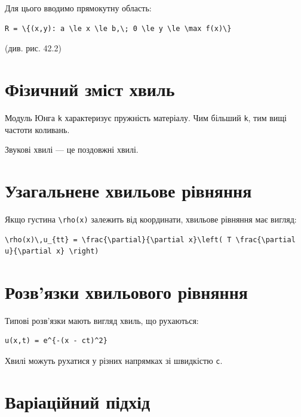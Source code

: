 \documentclass[
  ukrainian,
]{article}
\begin{document}
Для цього вводимо прямокутну область:

\begin{verbatim}
R = \{(x,y): a \le x \le b,\; 0 \le y \le \max f(x)\}
\end{verbatim}

(див. рис. 42.2)

\section{Фізичний зміст
хвиль}\label{ux444ux456ux437ux438ux447ux43dux438ux439-ux437ux43cux456ux441ux442-ux445ux432ux438ux43bux44c}

Модуль Юнга \texttt{k} характеризує пружність матеріалу. Чим більший
\texttt{k}, тим вищі частоти коливань.

Звукові хвилі --- це поздовжні хвилі.

\section{Узагальнене хвильове
рівняння}\label{ux443ux437ux430ux433ux430ux43bux44cux43dux435ux43dux435-ux445ux432ux438ux43bux44cux43eux432ux435-ux440ux456ux432ux43dux44fux43dux43dux44f}

Якщо густина \texttt{\textbackslash{}rho(x)} залежить від координати,
хвильове рівняння має вигляд:

\begin{verbatim}
\rho(x)\,u_{tt} = \frac{\partial}{\partial x}\left( T \frac{\partial u}{\partial x} \right)
\end{verbatim}

\section{Розв'язки хвильового
рівняння}\label{ux440ux43eux437ux432ux44fux437ux43aux438-ux445ux432ux438ux43bux44cux43eux432ux43eux433ux43e-ux440ux456ux432ux43dux44fux43dux43dux44f}

Типові розв'язки мають вигляд хвиль, що рухаються:

\begin{verbatim}
u(x,t) = e^{-(x - ct)^2}
\end{verbatim}

Хвилі можуть рухатися у різних напрямках зі швидкістю \texttt{c}.

\section{Варіаційний
підхід}\label{ux432ux430ux440ux456ux430ux446ux456ux439ux43dux438ux439-ux43fux456ux434ux445ux456ux434}
\end{document}
